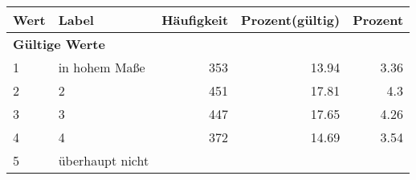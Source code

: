      \begin{longtable}{lXrrr}
     \toprule
     \textbf{Wert} & \textbf{Label} & \textbf{Häufigkeit} & \textbf{Prozent(gültig)} & \textbf{Prozent} \\
     \endhead
     \midrule
     \multicolumn{5}{l}{\textbf{Gültige Werte}}\\

     1 &
     \multicolumn{1}{X}{ in hohem Maße   } &


       \num{353} &
       \num[round-mode=places,round-precision=2]{13,94} &
         \num[round-mode=places,round-precision=2]{3,36} \\

     2 &
     \multicolumn{1}{X}{ 2   } &


       \num{451} &
       \num[round-mode=places,round-precision=2]{17,81} &
         \num[round-mode=places,round-precision=2]{4,3} \\

     3 &
     \multicolumn{1}{X}{ 3   } &


       \num{447} &
       \num[round-mode=places,round-precision=2]{17,65} &
         \num[round-mode=places,round-precision=2]{4,26} \\

     4 &
     \multicolumn{1}{X}{ 4   } &


       \num{372} &
       \num[round-mode=places,round-precision=2]{14,69} &
         \num[round-mode=places,round-precision=2]{3,54} \\

     5 &
     \multicolumn{1}{X}{ überhaupt nicht   } &



\end{longtable}
